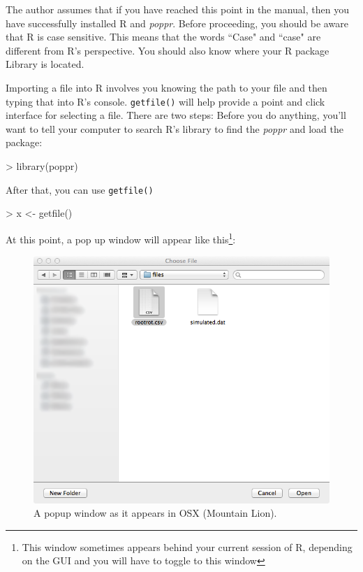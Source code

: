 \documentclass[letterpaper]{article}
\newcommand{\tab}{\hspace*{1em}}
\begin{document}
\tab\tab The author assumes that if you have reached this point in the manual, then you have successfully installed R and \textit{poppr}. Before proceeding, you should be aware that R is case sensitive. This means that the words ``Case" and ``case" are different from R's perspective. You should also know where your R package Library is located.
\begin{center}
\end{center}
Importing a file into R involves you knowing the path to your file and then typing that into R's console. \texttt{getfile()} will help provide a point and click interface for selecting a file. There are two steps:
Before you do anything, you'll want to tell your computer to search R's library to find the \textit{poppr} and load the package:
\begin{Schunk}
\begin{Sinput}
> library(poppr)
\end{Sinput}
\end{Schunk}
After that, you can use \texttt{getfile()}
\begin{Schunk}
\begin{Sinput}
> x <- getfile()
\end{Sinput}
\end{Schunk}
At this point, a pop up window will appear like this\footnote{This window sometimes appears behind your current session of R, depending on the GUI and you will have to toggle to this window}:
\begin{figure}[h!]
  \centering
  \caption{\footnotesize \footnotesize A popup window as it appears in OSX (Mountain Lion).}
  \label{getfile window}
\includegraphics{getfile.png}
\end{figure}
\end{document}
